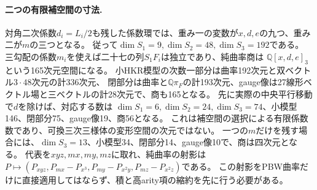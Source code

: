 \paragraph{二つの有限補空間の寸法.}
対角二次係数$d_i=L_i/2$も残した係数環では、重み一の変数が$x,d,e$の九つ、重み二が$m$の三つとなる。
従って$\dim S_1=9,\dim S_2=48,\dim S_3=192$である。
三勾配の係数$m_i$を使えば二十七の列$S_1F_i$は独立であり、純曲率商は
$\mathbb Q[x,d,e]_3$という165次元空間になる。
小HKR模型の次数一部分は曲率192次元と双ベクトル$3\cdot48$次元の計336次元、
閉部分は曲率と$\mathbb Q\pi_F$の計193次元、gauge像は27線形ベクトル場と三ベクトルの計28次元で、商も165となる。
先に実際の中央平行移動で$d$を除けば、対応する数は
$\dim S_1=6,\dim S_2=24,\dim S_3=74$、小模型146、閉部分75、gauge像19、商56となる。
これは補空間の選択による有限係数数であり、可換三次三様体の変形空間の次元ではない。
一つの$m$だけを残す場合には、$\dim S_3=13$、小模型34、閉部分14、gauge像10で、商は四次元となる。
代表を$xyz,mx,my,mz$に取れ、純曲率の射影は
$P\mapsto(P_{xyz},P_{mx}-P_{x^3},P_{my}-P_{x^2y},P_{mz}-P_{x^2z})$である。
この射影をPBW曲率だけに直接適用してはならず、積と高arity項の縮約を先に行う必要がある。
